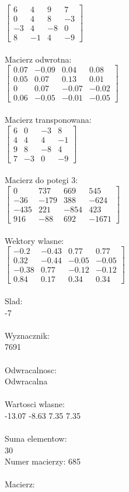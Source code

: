 \documentclass[a4paper,12pt]{article}
\begin{document}
$\begin{bmatrix} 6&4&9&7\\0&4&8&-3\\-3&4&-8&0\\8&-1&4&-9 \end{bmatrix}$
\\
\\
Macierz odwrotna:\\

$\begin{bmatrix} 0.07&-0.09&0.04&0.08\\0.05&0.07&0.13&0.01\\0&0.07&-0.07&-0.02\\0.06&-0.05&-0.01&-0.05 \end{bmatrix}$
\\
\\
Macierz transponowana:\\

$\begin{bmatrix} 6&0&-3&8\\4&4&4&-1\\9&8&-8&4\\7&-3&0&-9 \end{bmatrix}$
\\
\\
Macierz do potegi 3:\\

$\begin{bmatrix} 0&737&669&545\\-36&-179&388&-624\\-435&221&-854&423\\916&-88&692&-1671 \end{bmatrix}$
\\
\\
Wektory wlasne:\\

$\begin{bmatrix} -0.2&-0.43&0.77&0.77\\0.32&-0.44&-0.05&-0.05\\-0.38&0.77&-0.12&-0.12\\0.84&0.17&0.34&0.34 \end{bmatrix}$
\\
\\
Slad:\\
-7
\\
\\
Wyznacznik:\\
7691
\\
\\
Odwracalnosc:\\
Odwracalna
\\
\\
Wartosci wlasne:\\
-13.07 -8.63 7.35 7.35
\\
\\
Suma elementow:\\
30
\\
\newpage
Numer macierzy:
685
\\
\\
Macierz:\\
\end{document}
